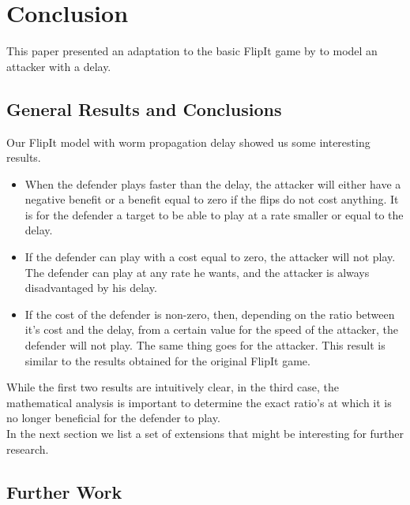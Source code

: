 \chapter{Conclusion}
\label{chapter5:conclusion}

This paper presented an adaptation to the basic FlipIt game by \citep{FlipIt} to model an attacker with a delay.  

\section{General Results and Conclusions}
Our FlipIt model with worm propagation delay showed us some interesting results. 
\begin{itemize}
\item When the defender plays faster than the delay, the attacker will either have a negative benefit or a benefit equal to zero if the flips do not cost anything. It is for the defender a target to be able to play at a rate smaller or equal to the delay.
\item If the defender can play with a cost equal to zero, the attacker will not play. The defender can play at any rate he wants, and the attacker is always disadvantaged by his delay.
\item If the cost of the defender is non-zero, then, depending on the ratio between it's cost and the delay, from a certain value for the speed of the attacker, the defender will not play. The same thing goes for the attacker. This result is similar to the results obtained for the original FlipIt game.
\end{itemize}

While the first two results are intuitively clear, in the third case, the mathematical analysis is important to determine the exact ratio's at which it is no longer beneficial for the defender to play. \\
In the next section we list a set of extensions that might be interesting for further research.
\section{Further Work}


